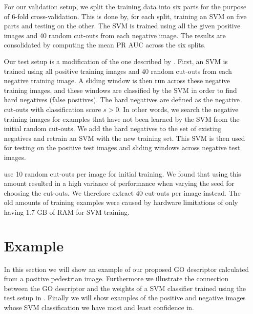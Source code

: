 \documentclass[thesis.tex]{subfiles}
\begin{document}
For our validation setup, we split the training data into six parts for the purpose of 6-fold cross-validation. This is done by, for each split, training an SVM on five parts and testing on the other. The SVM is trained using all the given positive images and 40 random cut-outs from each negative image. The results are consolidated by computing the mean PR AUC across the six splits.

Our test setup is a modification of the one described by \citet{dalal2005histograms}. First, an SVM is trained using all positive training images and 40 random cut-outs from each negative training image. A sliding window is then run across these negative training images, and these windows are classified by the SVM in order to find hard negatives (false positives). The hard negatives are defined as the negative cut-outs with classification score $s > 0$. In other words, we search the negative training images for examples that have not been learned by the SVM from the initial random cut-outs. We add the hard negatives to the set of existing negatives and retrain an SVM with the new training set. This SVM is then used for testing on the positive test images and sliding windows across negative test images.

\citet{dalal2005histograms} use 10 random cut-outs per image for initial training. We found that using this amount resulted in a high variance of performance when varying the seed for choosing the cut-outs. We therefore extract 40 cut-outs per image instead. The old amounts of training examples were caused by hardware limitations of only having $1.7$ GB of RAM for SVM training.

\section{Example}
%
In this section we will show an example of our proposed GO descriptor calculated from a positive pedestrian image. Furthermore we illustrate the connection between the GO descriptor and the weights of a SVM classifier trained using the test setup in .
Finally we will show examples of the positive and negative images whose SVM classification we have most and least confidence in.
\end{document}

